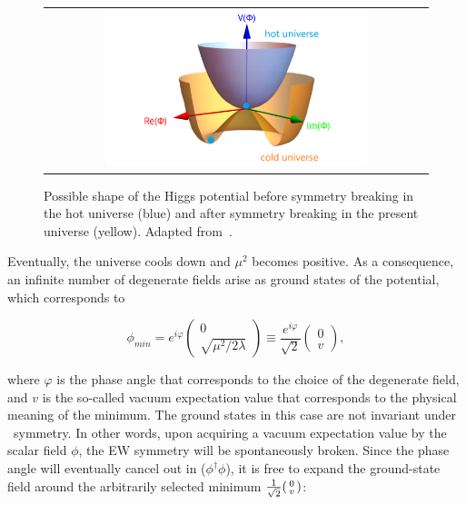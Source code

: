 \begin{figure}[tbh!]
 \begin{center}
 \begin{tabular}{c}
 \includegraphics[width=0.7\textwidth]{figures/Part1/SM/HiggsPotential}
 \end{tabular}
 \caption{Possible shape of the Higgs potential before symmetry breaking in the hot universe (blue) and after symmetry breaking in the present universe (yellow). Adapted from~\cite{universe9040178}.}
 \label{fig:HiggsPotential}
 \end{center}
\end{figure}

Eventually, the universe cools down and $\mu^2$ becomes positive. As a consequence, an infinite number of degenerate fields arise as ground states of the potential, which corresponds to 

\begin{equation}
\phi_{min}=e^{i\varphi}\begin{pmatrix}0\\\sqrt{\mu^2/2\lambda}\end{pmatrix}\equiv\frac{e^{i\varphi}}{\sqrt{2}}\begin{pmatrix}0\\v\end{pmatrix},
\end{equation}

where $\varphi$ is the phase angle that corresponds to the choice of the degenerate field, and $v$ is the so-called vacuum expectation value that corresponds to the physical meaning of the minimum. The ground states in this case are not invariant under \ew~symmetry. In other words, upon acquiring a vacuum expectation value by the scalar field $\phi$, the \ac{EW} symmetry will be spontaneously broken. Since the phase angle will eventually cancel out in ($\phi^{\dagger}\phi$), it is free to expand the ground-state field around the arbitrarily selected minimum $\frac{1}{\sqrt{2}}\begin{psmallmatrix}0\\v\end{psmallmatrix}$:

